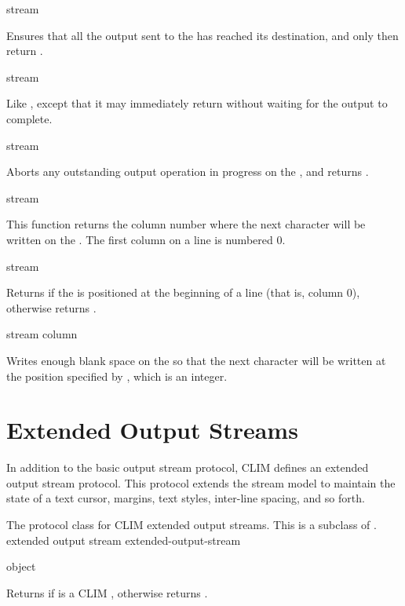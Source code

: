  {stream}

Ensures that all the output sent to the   has
reached its destination, and only then return .

 {stream}

Like , except that it may immediately return
 without waiting for the output to complete.

 {stream}

Aborts any outstanding output operation in progress on the 
, and returns .

 {stream}

This function returns the column number where the next character will be written
on the  .  The first column on a line is
numbered 0.

 {stream}

Returns  if the   is positioned at
the beginning of a line (that is, column 0), otherwise returns .

 {stream column}

Writes enough blank space on the   so that the
next character will be written at the position specified by , which
is an integer.


\section {Extended Output Streams}

In addition to the basic output stream protocol, CLIM defines an extended output
stream protocol.  This protocol extends the stream model to maintain the state
of a text cursor, margins, text styles, inter-line spacing, and so forth.


The protocol class for CLIM extended output streams.  This is a subclass of
.
 {extended output stream} {extended-output-stream}

 {object}

Returns  if  is a CLIM ,
otherwise returns .

